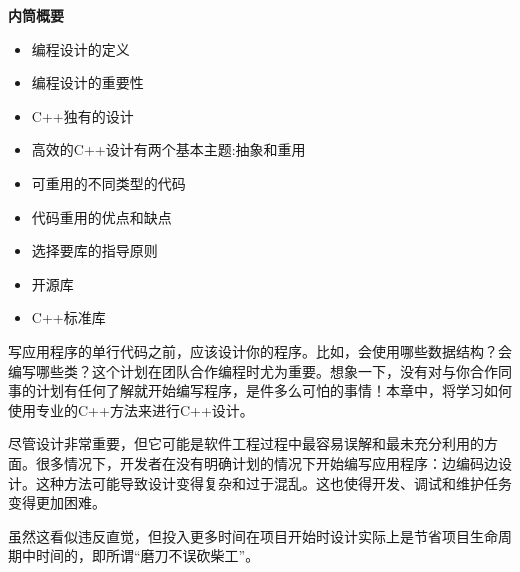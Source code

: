 \noindent
\textbf{内筒概要}

\begin{itemize}
\item
编程设计的定义

\item
编程设计的重要性

\item
C++独有的设计

\item
高效的C++设计有两个基本主题:抽象和重用

\item
可重用的不同类型的代码

\item
代码重用的优点和缺点

\item
选择要库的指导原则

\item
开源库

\item
C++标准库
\end{itemize}

写应用程序的单行代码之前，应该设计你的程序。比如，会使用哪些数据结构？会编写哪些类？这个计划在团队合作编程时尤为重要。想象一下，没有对与你合作同事的计划有任何了解就开始编写程序，是件多么可怕的事情！本章中，将学习如何使用专业的C++方法来进行C++设计。

尽管设计非常重要，但它可能是软件工程过程中最容易误解和最未充分利用的方面。很多情况下，开发者在没有明确计划的情况下开始编写应用程序：边编码边设计。这种方法可能导致设计变得复杂和过于混乱。这也使得开发、调试和维护任务变得更加困难。

虽然这看似违反直觉，但投入更多时间在项目开始时设计实际上是节省项目生命周期中时间的，即所谓“磨刀不误砍柴工”。












